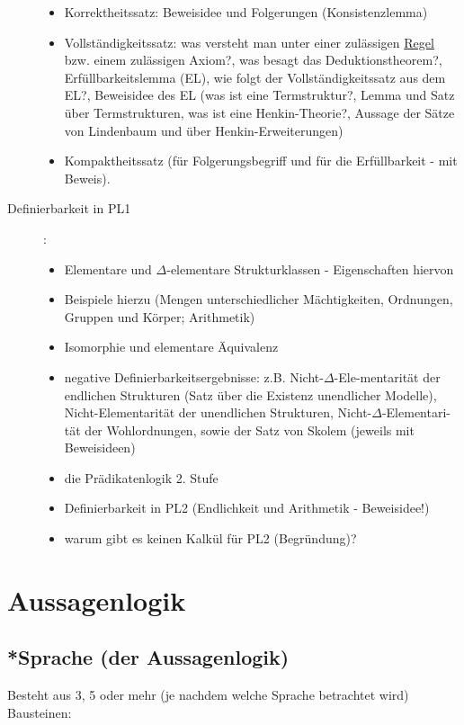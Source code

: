 \documentclass[12pt,a4paper]{article} %
\begin{document}
\begin{description}
\begin{itemize}
			\item Korrektheitssatz: Beweisidee und Folgerungen (Konsistenzlemma)
			\item Vollständigkeitssatz: was versteht man unter einer zulässigen \hyperref[Kalkul]{Regel} bzw. einem zulässigen Axiom?, was besagt das Deduktionstheorem?, Erfüllbarkeitslemma (EL), wie folgt der Vollständigkeitssatz aus dem EL?, Beweisidee des EL (was ist eine Termstruktur?, Lemma und Satz über Termstrukturen, was ist eine Henkin-Theorie?, Aussage der Sätze von Lindenbaum und über Henkin-Erweiterungen)
			\item Kompaktheitssatz (für Folgerungsbegriff und für die Erfüllbarkeit - mit Beweis).
		\end{itemize}
		\item[Definierbarkeit in PL1]:
		\begin{itemize}
			\item Elementare und $\Delta$-elementare Strukturklassen - Eigenschaften
			hiervon
			\item Beispiele hierzu (Mengen unterschiedlicher Mächtigkeiten, Ordnungen, Gruppen
			und Körper; Arithmetik)
			\item Isomorphie und elementare Äquivalenz
			\item negative Definierbarkeitsergebnisse: z.B. Nicht-$\Delta$-Ele-mentarität der endlichen Strukturen (Satz über die Existenz unendlicher Modelle), Nicht-Elementarität der unendlichen Strukturen, Nicht-$\Delta$-Elementari-tät der Wohlordnungen, sowie der Satz von Skolem (jeweils mit Beweisideen)
			\item die Prädikatenlogik 2. Stufe
			\item Definierbarkeit in PL2 (Endlichkeit und Arithmetik - Beweisidee!)
			\item warum gibt es keinen Kalkül für PL2 (Begründung)?
		\end{itemize}
	\end{description}
	
	\newpage
	\tableofcontents
	\newpage
	
	\section{Aussagenlogik}
	\subsection{*Sprache (der Aussagenlogik)}
	\label{Sprache}
	Besteht aus 3, 5 oder mehr (je nachdem welche Sprache betrachtet wird) Bausteinen:
	
\end{document}
